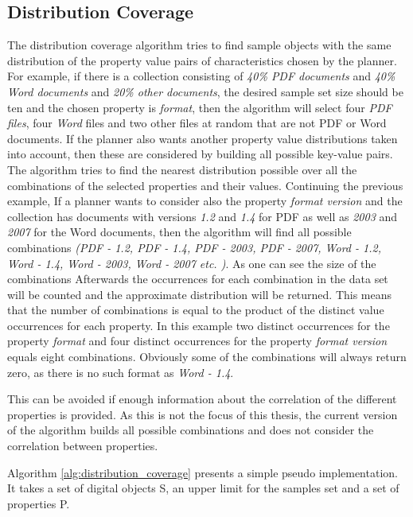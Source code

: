 \subsection{Distribution Coverage}
The distribution coverage algorithm tries to find sample objects with the same distribution of the property value pairs of characteristics chosen by the planner. For example, if there is a collection consisting of \textit{40\% PDF documents} and \textit{40\% Word documents} and \textit{20\% other documents}, the desired sample set size should be ten and the chosen property is \textit{format}, then the algorithm will select four \textit{PDF files}, four \textit{Word} files and two other files at random that are not PDF or Word documents.
If the planner also wants another property value distributions taken into account, then these are considered by building all possible key-value pairs. The algorithm tries to find the nearest distribution possible over all the combinations of the selected properties and their values.
Continuing the previous example, If a planner wants to consider also the property \textit{format version} and the collection has documents with versions \textit{1.2} and \textit{1.4} for PDF as well as \textit{2003} and \textit{2007} for the Word documents, then the algorithm will find all possible combinations \textit{(PDF - 1.2, PDF - 1.4, PDF - 2003, PDF - 2007, Word - 1.2, Word - 1.4, Word - 2003, Word - 2007 etc. )}. As one can see the size of the combinations 
Afterwards the occurrences for each combination in the data set will be counted and the approximate distribution will be returned. This means that the number of combinations is equal to the product of the distinct value occurrences for each property. In this example two distinct occurrences for the property \textit{format} and four distinct occurrences for the property \textit{format version} equals eight combinations. Obviously some of the combinations will always return zero, as there is no such format as \textit{Word - 1.4}. 

This can be avoided if enough information about the correlation of the different properties is provided. As this is not the focus of this thesis, the current version of the algorithm builds all possible combinations and does not consider the correlation between properties.

Algorithm \ref{alg:distribution_coverage} presents a simple pseudo implementation. It takes a set of digital objects S, an upper limit for the samples set and a set of properties P.

